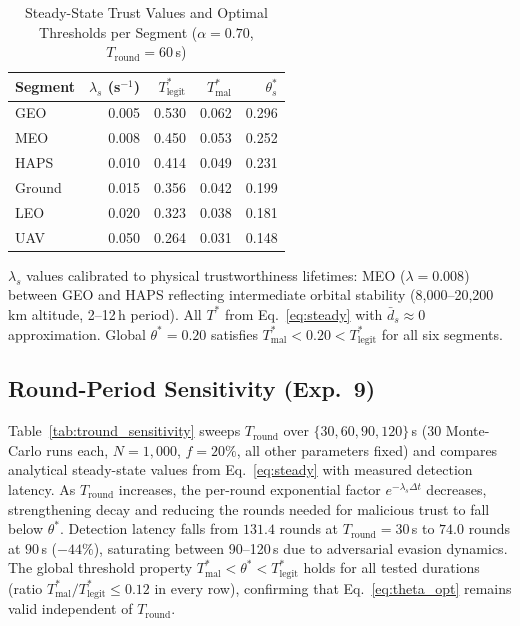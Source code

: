 \documentclass[journal,twoside,10pt]{IEEEtran}
\begin{document}
\begin{table}[t]
\centering
\caption{Steady-State Trust Values and Optimal Thresholds per Segment
         ($\alpha\!=\!0.70$, $T_{\mathrm{round}}\!=\!60$\,s)}
\label{tab:lambda}
\renewcommand{\arraystretch}{1.15}
\small
\begin{tabular}{lrrrr}
\toprule
Segment & $\lambda_s$ (s$^{-1}$) & $T^*_{\mathrm{legit}}$ &
          $T^*_{\mathrm{mal}}$ & $\theta^*_s$ \\
\midrule
GEO    & 0.005 & 0.530 & 0.062 & 0.296 \\
MEO    & 0.008 & 0.450 & 0.053 & 0.252 \\
HAPS   & 0.010 & 0.414 & 0.049 & 0.231 \\
Ground & 0.015 & 0.356 & 0.042 & 0.199 \\
LEO    & 0.020 & 0.323 & 0.038 & 0.181 \\
UAV    & 0.050 & 0.264 & 0.031 & 0.148 \\
\bottomrule
\end{tabular}
{\footnotesize $\lambda_s$ values calibrated to physical trustworthiness
 lifetimes: MEO ($\lambda\!=\!0.008$) between GEO and HAPS reflecting
 intermediate orbital stability (8{,}000--20{,}200\,km altitude,
 2--12\,h period). All $T^*$ from Eq.~\eqref{eq:steady} with
 $\bar{d}_s\!\approx\!0$ approximation.
 Global $\theta^*\!=\!0.20$ satisfies
 $T^*_{\mathrm{mal}} < 0.20 < T^*_{\mathrm{legit}}$ for all six segments.}
\end{table}

\subsection{Round-Period Sensitivity (Exp.~9)}
\label{sec:tround}

Table~\ref{tab:tround_sensitivity} sweeps $T_{\mathrm{round}}$ over
$\{30, 60, 90, 120\}$\,s (30 Monte-Carlo runs each, $N\!=\!1{,}000$,
$f\!=\!20\%$, all other parameters fixed) and compares analytical
steady-state values from Eq.~\eqref{eq:steady} with measured detection
latency.
As $T_{\mathrm{round}}$ increases, the per-round exponential factor
$e^{-\lambda_s \Delta t}$ decreases, strengthening decay and reducing
the rounds needed for malicious trust to fall below $\theta^*$.
Detection latency falls from $131.4$ rounds at $T_{\mathrm{round}}\!=\!30$\,s
to $74.0$ rounds at $90$\,s ($-44\%$), saturating between 90--120\,s
due to adversarial evasion dynamics.
The global threshold property
$T^*_{\mathrm{mal}} < \theta^* < T^*_{\mathrm{legit}}$ holds for all
tested durations (ratio $T^*_{\mathrm{mal}}/T^*_{\mathrm{legit}} \leq 0.12$
in every row), confirming that Eq.~\eqref{eq:theta_opt} remains valid
independent of $T_{\mathrm{round}}$.
\end{document}
